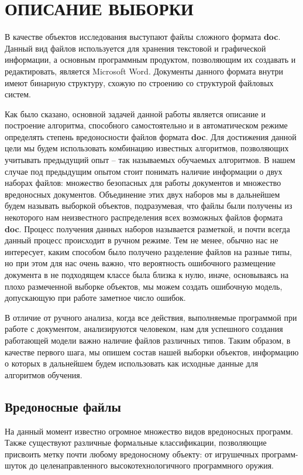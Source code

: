 \chapter{ОПИСАНИЕ ВЫБОРКИ}

В качестве объектов исследования выступают файлы сложного формата \textbf{doc}.
Данный вид файлов используется для хранения текстовой и графической информации, а основным программным продуктом, позволяющим их создавать и редактировать, является Microsoft Word.
Документы данного формата внутри имеют бинарную структуру, схожую по строению со структурой файловых систем. \cite{doc_format}

Как было сказано, основной задачей данной работы является описание и построение алгоритма, способного самостоятельно и в автоматическом режиме определять степень вредоносности файлов формата \textbf{doc}.
Для достижения данной цели мы будем использовать комбинацию известных алгоритмов, позволяющих учитывать предыдущий опыт -- так называемых обучаемых алгоритмов.
В нашем случае под предыдущим опытом стоит понимать наличие информации о двух наборах файлов: множество безопасных для работы документов и множество вредоносных документов.
Объединение этих двух наборов мы в дальнейшем будем называть выборкой объектов, подразумевая, что файлы были получены из некоторого нам неизвестного распределения всех возможных файлов формата \textbf{doc}. 
Процесс получения данных наборов называется разметкой, и почти всегда данный процесс происходит в ручном режиме.
Тем не менее, обычно нас не интересует, каким способом было получено разделение файлов на разные типы, но при этом для нас очень важно, что вероятность ошибочного размещение документа в не подходящем классе была близка к нулю, иначе, основываясь на плохо размеченной выборке объектов, мы можем создать ошибочную модель, допускающую при работе заметное число ошибок.

В отличие от ручного анализа, когда все действия, выполняемые программой при работе с документом, анализируются человеком, нам для успешного создания работающей модели важно наличие файлов различных типов.
Таким образом, в качестве первого шага, мы опишем состав нашей выборки объектов, информацию о которых в дальнейшем будем использовать как исходные данные для алгоритмов обучения.

\section{Вредоносные файлы}

На данный момент известно огромное множество видов вредоносных программ.
Также существуют различные формальные классификации, позволяющие присвоить метку почти любому вредоносному объекту: от игрушечных программ-шуток до целенаправленного высокотехнологичного программного оружия.


